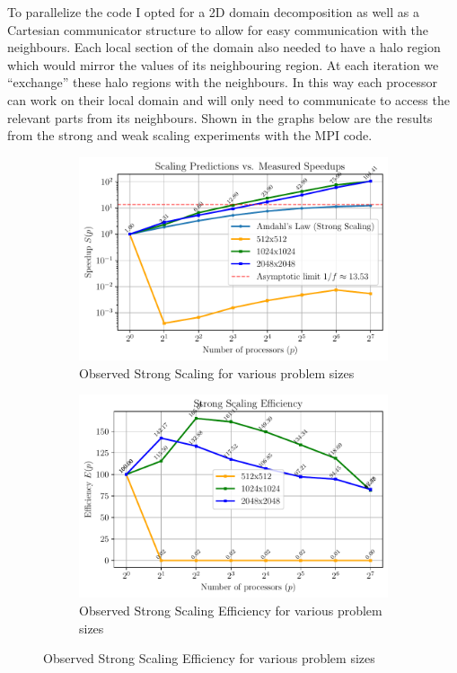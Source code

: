 To parallelize the code I opted for a 2D domain decomposition as well as a Cartesian communicator structure to allow for
easy communication with the neighbours. Each local section of the domain also needed to have a halo region which would
mirror the values of its neighbouring region. At each iteration we ``exchange'' these halo regions with the neighbours.
In this way each processor can work on their local domain and will only need to communicate to access the relevant parts
from its neighbours. Shown in the graphs below are the results from the strong and weak scaling experiments with the MPI
code.
\begin{figure}[h!]
    \begin{subfigure}{0.5\textwidth}
        \centering
        \includegraphics[width=0.95\linewidth]{./plots/strong_scaling.pdf}
        \caption{Observed Strong Scaling for various problem sizes}
        \label{fig:strong_scaling}
    \end{subfigure}
    \hfill
    \begin{subfigure}{0.5\textwidth}
        \centering    
        \includegraphics[width=0.95\linewidth]{./plots/strong_scaling_efficiency.pdf}
        \caption{Observed Strong Scaling Efficiency for various problem sizes}
        \label{fig:strong_scaling_efficiency}
    \end{subfigure}
\end{figure}

